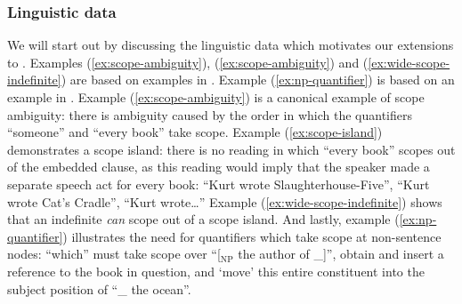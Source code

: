 \documentclass[10pt,a4paper]{llncs}
\begin{document}
\subsubsection*{Linguistic data}
We will start out by discussing the linguistic data which motivates
our extensions to \NLCL.
Examples (\ref{ex:scope-ambiguity}), (\ref{ex:scope-ambiguity}) and
(\ref{ex:wide-scope-indefinite}) are based on examples in
\citet[][p.\ 608, 622]{szabolcsi2000}.
Example (\ref{ex:np-quantifier}) is based on an example in
\citet[][p.\ 208]{barker2015}.
%
%
%
Example (\ref{ex:scope-ambiguity}) is a canonical example of scope
ambiguity: there is ambiguity caused by the order in which the
quantifiers ``someone'' and ``every book'' take scope.
%
Example (\ref{ex:scope-island}) demonstrates a scope island:
there is no reading in which ``every book'' scopes out of the embedded
clause, as this reading would imply that the speaker made a separate
speech act for every book: ``Kurt wrote Slaughterhouse-Five'', ``Kurt
wrote Cat's Cradle'', ``Kurt wrote\ldots''
%
Example (\ref{ex:wide-scope-indefinite}) shows that an indefinite
\emph{can} scope out of a scope island.
%
And lastly, example (\ref{ex:np-quantifier}) illustrates the need for
quantifiers which take scope at non-sentence nodes: ``which'' must take
scope over ``[$_{\text{NP}}$ the author of \_]'', obtain and insert a
reference to the book in question, and `move' this entire constituent
into the subject position of ``\_ the ocean''.
\end{document}
